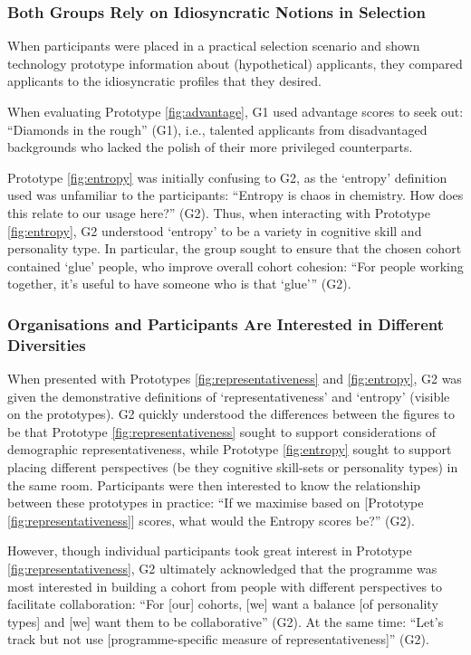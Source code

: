 \subsubsection{Both Groups Rely on Idiosyncratic Notions in Selection}
When participants were placed in a practical selection scenario and shown technology prototype information about (hypothetical) applicants, they compared applicants to the idiosyncratic profiles that they desired.

When evaluating Prototype \ref{fig:advantage}, G1 used advantage scores to seek out: ``Diamonds in the rough'' (G1), i.e., talented applicants from disadvantaged backgrounds who lacked the polish of their more privileged counterparts.

Prototype \ref{fig:entropy} was initially confusing to G2, as the `entropy' definition used was unfamiliar to the participants: ``Entropy is chaos in chemistry. How does this relate to our usage here?'' (G2). Thus, when interacting with Prototype \ref{fig:entropy}, G2 understood `entropy' to be a variety in cognitive skill and personality type. In particular, the group sought to ensure that the chosen cohort contained `glue' people, who improve overall cohort cohesion: ``For people working together, it's useful to have someone who is that `glue''' (G2). 

\subsubsection{Organisations and Participants Are Interested in Different Diversities}
When presented with Prototypes \ref{fig:representativeness} and \ref{fig:entropy}, G2 was given the demonstrative definitions of `representativeness' and `entropy' (visible on the prototypes). G2 quickly understood the differences between the figures to be that Prototype \ref{fig:representativeness} sought to support considerations of demographic representativeness, while Prototype \ref{fig:entropy} sought to support placing different perspectives (be they cognitive skill-sets or personality types) in the same room. Participants were then interested to know the relationship between these prototypes in practice: ``If we maximise based on [Prototype \ref{fig:representativeness}] scores, what would the Entropy scores be?'' (G2).

However, though individual participants took great interest in Prototype \ref{fig:representativeness}, G2 ultimately acknowledged that the programme was most interested in building a cohort from people with different perspectives to facilitate collaboration: ``For [our] cohorts, [we] want a balance [of personality types] and [we] want them to be collaborative'' (G2). At the same time: ``Let's track but not use [programme-specific measure of representativeness]'' (G2).

